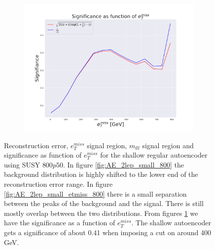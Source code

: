 \begin{figure}[H]
    \hfill  
    \begin{subfigure}{.50\textwidth}
        \includegraphics[width=\textwidth]{Figures/AE_testing/small/2lep/significance_etmiss_800p0p050_-1.6117055611472277.pdf}
        \caption{}
        \label{fig:AE_2lep_small_signi_800}
    \end{subfigure}
    \hfill      
    \caption[2lep shallow network | $800p50$ | AE]{Reconstruction error, $e_T^{miss}$ signal region, $m_{lll}$ signal region and significance as function of 
    $e_T^{miss}$ for the shallow regular autoencoder using SUSY $800p50$. In figure 
    \ref{fig:AE_2lep_small_800} the background distribution is highly shifted to the lower end of the 
    reconstruction error range. In figure \ref{fig:AE_2lep_small_etmiss_800} there is a small separation 
    between the peaks of the background and the signal. There is still mostly overlap between the two distributions.
    From figures  \ref{fig:AE_2lep_small_signi_800} we have the significance as a function of $e_T^{miss}$. 
    The shallow autoencoder gets a significance of about 0.41 when imposing a cut on around 400 GeV.}
    \label{fig:AE_2lep_small_rec_sig_signi_800}
\end{figure}


